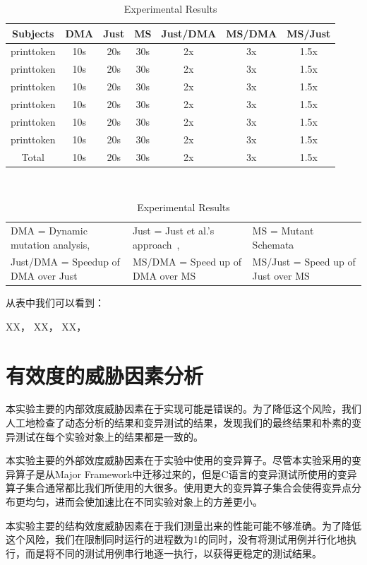 \documentclass[nofonts]{ctexrep}
\begin{document}
\begin{table}[t]
  \centering
  \caption{Experimental Results}
  \label{tab:results}
  \begin{tabular}{|c|c|c|c|c|c|c|}
    \hline
    Subjects & DMA & Just & MS & Just/DMA & MS/DMA & MS/Just\\
    \hline
    printtoken & 10s & 20s & 30s & 2x & 3x & 1.5x\\
    printtoken & 10s & 20s & 30s & 2x & 3x & 1.5x\\
    printtoken & 10s & 20s & 30s & 2x & 3x & 1.5x\\
    printtoken & 10s & 20s & 30s & 2x & 3x & 1.5x\\
    printtoken & 10s & 20s & 30s & 2x & 3x & 1.5x\\
    printtoken & 10s & 20s & 30s & 2x & 3x & 1.5x\\
    \hline
    Total & 10s & 20s & 30s & 2x & 3x & 1.5x\\
    \hline
  \end{tabular}\\
  \begin{tabular}{lll}
  DMA = Dynamic mutation analysis, & Just = Just et al.'s
                                     approach~\cite{just2014efficient},
    & MS = Mutant Schemata~\cite{untch1993mutation} \\
    Just/DMA = Speedup of DMA over Just & MS/DMA = Speed up of DMA
                                          over MS & MS/Just = Speed up
                                                    of Just over MS
  \end{tabular}
\end{table}

从表中我们可以看到：

XX，
XX，
XX，

\section{有效度的威胁因素分析}
本实验主要的内部效度威胁因素在于实现可能是错误的。为了降低这个风险，我们人工地检查了动态分析的结果和变异测试的结果，发现我们的最终结果和朴素的变异测试在每个实验对象上的结果都是一致的。

本实验主要的外部效度威胁因素在于实验中使用的变异算子。尽管本实验采用的变异算子是从Major Framework中迁移过来的，但是C语言的变异测试所使用的变异算子集合通常都比我们所使用的大很多。使用更大的变异算子集合会使得变异点分布更均匀，进而会使加速比在不同实验对象上的方差更小。

本实验主要的结构效度威胁因素在于我们测量出来的性能可能不够准确。为了降低这个风险，我们在限制同时运行的进程数为1的同时，没有将测试用例并行化地执行，而是将不同的测试用例串行地逐一执行，以获得更稳定的测试结果。
\end{document}
